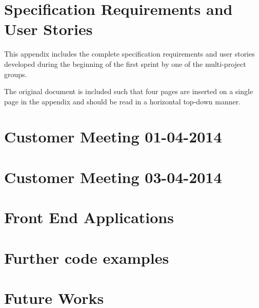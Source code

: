 \chapter{Specification Requirements and User Stories}\label{appendix:requirements}
This appendix includes the complete specification requirements and user stories developed during the beginning of the first sprint by one of the multi-project groups.

The original document is included such that four pages are inserted on a single page in the appendix and should be read in a horizontal top-down manner.



\chapter{Customer Meeting 01-04-2014}\label{appendix:firstmeeting}


\chapter{Customer Meeting 03-04-2014}\label{appendix:secondmeeting}


\chapter{Front End Applications}\label{sec:giraf:applications:frontend}


\chapter{Further code examples}\label{appendix:codeexamples}


\chapter{Future Works}\label{appendix:futureworks}
